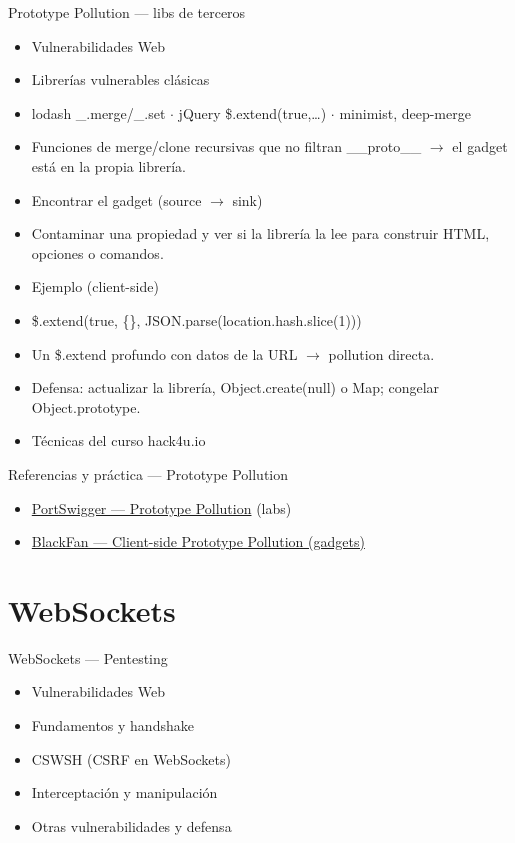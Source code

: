 \documentclass[aspectratio=169,10pt]{beamer}
\begin{document}
\begin{frame}[allowframebreaks]{Prototype Pollution --- libs de terceros}
\small
  \begin{itemize}
  \item Vulnerabilidades Web
  \item Librerías vulnerables clásicas
  \item lodash \_.merge/\_.set $\cdot$ jQuery \$.extend(true,\dots{}) $\cdot$ minimist, deep-merge
  \item Funciones de merge/clone recursivas que no filtran \_\_proto\_\_ $\rightarrow$ el gadget está en la propia librería.
  \item Encontrar el gadget (source $\rightarrow$ sink)
  \item Contaminar una propiedad y ver si la librería la lee para construir HTML, opciones o comandos.
  \item Ejemplo (client-side)
  \item \$.extend(true, \{\}, JSON.parse(location.hash.slice(1)))
  \item Un \$.extend profundo con datos de la URL $\rightarrow$ pollution directa.
  \item Defensa: actualizar la librería, Object.create(null) o Map; congelar Object.prototype.
  \item Técnicas del curso hack4u.io
  \end{itemize}
\end{frame}

\begin{frame}{Referencias y práctica --- Prototype Pollution}
\footnotesize
  \begin{itemize}
  \item \href{https://portswigger.net/web-security/prototype-pollution}{PortSwigger --- Prototype Pollution} (labs)
  \item \href{https://github.com/BlackFan/client-side-prototype-pollution}{BlackFan --- Client-side Prototype Pollution (gadgets)}
  \end{itemize}
\end{frame}

\section{WebSockets}

\begin{frame}[allowframebreaks]{WebSockets --- Pentesting}
\small
  \begin{itemize}
  \item Vulnerabilidades Web
  \item Fundamentos y handshake
  \item CSWSH (CSRF en WebSockets)
  \item Interceptación y manipulación
  \item Otras vulnerabilidades y defensa
  \end{itemize}
\end{frame}
\end{document}
